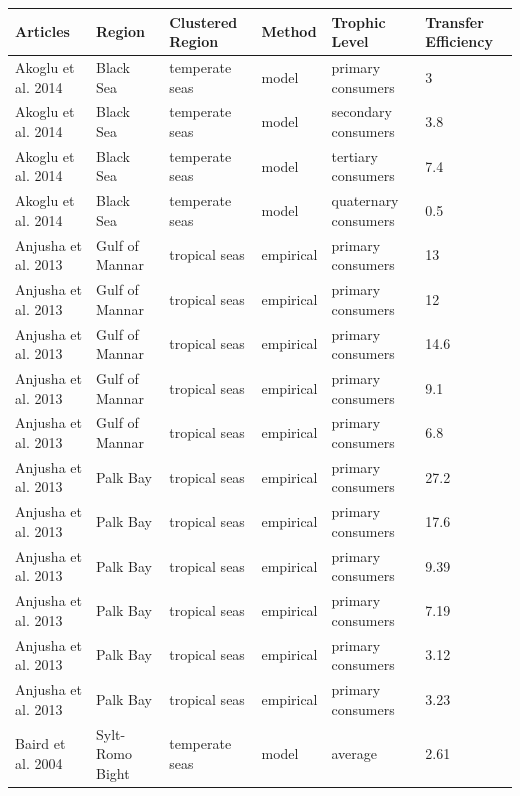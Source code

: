 \documentclass[oneside,12pt,final]{sty/ucthesis-CA2012}
\begin{document}
\begin{mainmatter}
\small %
\begin{longtable} {p{3cm}p{3cm}p{1.8cm}lp{2cm}p{1.7cm}}
	\toprule
    Articles & Region & Clustered Region & Method & Trophic Level & Transfer Efficiency \\
    \midrule
    \endhead
    Akoglu et al. 2014  & Black Sea & temperate seas & model & primary consumers & 3 \\
    Akoglu et al. 2014   & Black Sea & temperate seas & model & secondary consumers & 3.8 \\
    Akoglu et al. 2014  & Black Sea & temperate seas & model & tertiary consumers & 7.4 \\
    Akoglu et al. 2014  & Black Sea & temperate seas & model & quaternary consumers & 0.5 \\
    Anjusha et al. 2013   & Gulf of Mannar & tropical seas & empirical & primary consumers & 13 \\
    Anjusha et al. 2013   & Gulf of Mannar & tropical seas & empirical & primary consumers & 12 \\
    Anjusha et al. 2013   & Gulf of Mannar & tropical seas & empirical & primary consumers & 14.6 \\
    Anjusha et al. 2013  & Gulf of Mannar & tropical seas & empirical & primary consumers & 9.1 \\
    Anjusha et al. 2013   & Gulf of Mannar & tropical seas & empirical & primary consumers & 6.8 \\
    Anjusha et al. 2013 & Palk Bay & tropical seas & empirical & primary consumers & 27.2 \\
    Anjusha et al. 2013   & Palk Bay & tropical seas & empirical & primary consumers & 17.6 \\
    Anjusha et al. 2013  & Palk Bay & tropical seas & empirical & primary consumers & 9.39 \\
    Anjusha et al. 2013  & Palk Bay & tropical seas & empirical & primary consumers & 7.19 \\
    Anjusha et al. 2013  & Palk Bay & tropical seas & empirical & primary consumers & 3.12 \\
    Anjusha et al. 2013  & Palk Bay & tropical seas & empirical & primary consumers & 3.23 \\
    Baird et al. 2004  & Sylt-Romo Bight & temperate seas & model & average & 2.61 \\

\end{longtable}
\end{mainmatter}
\end{document}
